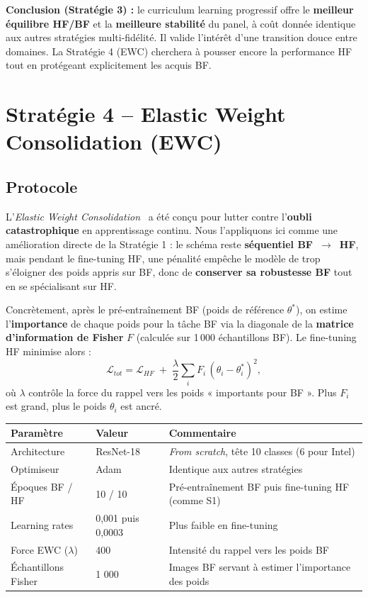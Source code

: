 \documentclass[11pt,a4paper,openany]{book}
\newcommand{\tableheadcolor}{\rowcolor{headerbg}}
\begin{document}
\begin{decisionbox}
  \textbf{Conclusion (Stratégie 3) :} le curriculum learning progressif offre le \textbf{meilleur équilibre HF/BF} et la \textbf{meilleure stabilité} du panel, à coût donnée identique aux autres stratégies multi-fidélité. Il valide l'intérêt d'une transition douce entre domaines. La Stratégie 4 (EWC) cherchera à pousser encore la performance HF tout en protégeant explicitement les acquis BF.
\end{decisionbox}

\section{Stratégie 4 -- Elastic Weight Consolidation (EWC)}

\subsection{Protocole}

L'\textit{Elastic Weight Consolidation}~\cite{kirkpatrick2017ewc} a été conçu pour lutter contre l'\textbf{oubli catastrophique} en apprentissage continu. Nous l'appliquons ici comme une amélioration directe de la Stratégie 1 : le schéma reste \textbf{séquentiel BF~$\rightarrow$~HF}, mais pendant le fine-tuning HF, une pénalité empêche le modèle de trop s'éloigner des poids appris sur BF, donc de \textbf{conserver sa robustesse BF} tout en se spécialisant sur HF.

Concrètement, après le pré-entraînement BF (poids de référence $\theta^{*}$), on estime l'\textbf{importance} de chaque poids pour la tâche BF via la diagonale de la \textbf{matrice d'information de Fisher} $F$ (calculée sur 1\,000 échantillons BF). Le fine-tuning HF minimise alors :
\[
  \mathcal{L}_{tot} = \mathcal{L}_{HF} \;+\; \frac{\lambda}{2}\sum_i F_i\,(\theta_i - \theta^{*}_i)^2 ,
\]
où $\lambda$ contrôle la force du rappel vers les poids « importants pour BF ». Plus $F_i$ est grand, plus le poids $\theta_i$ est ancré.

\vspace{0.6em}
\renewcommand{\arraystretch}{1.45}
\begin{tabularx}{\linewidth}{L{4.1cm} C{3cm} L{7.6cm}}
  \toprule
  \tableheadcolor
  \textbf{Paramètre} & \textbf{Valeur} & \textbf{Commentaire} \\
  \midrule
  Architecture & ResNet-18 & \textit{From scratch}, tête 10 classes (6 pour Intel) \\
  Optimiseur & Adam & Identique aux autres stratégies \\
  Époques BF / HF & 10 / 10 & Pré-entraînement BF puis fine-tuning HF (comme S1) \\
  Learning rates & 0,001 puis 0,0003 & Plus faible en fine-tuning \\
  Force EWC ($\lambda$) & 400 & Intensité du rappel vers les poids BF \\
  Échantillons Fisher & 1 000 & Images BF servant à estimer l'importance des poids \\
  \bottomrule
\end{tabularx}
\end{document}

